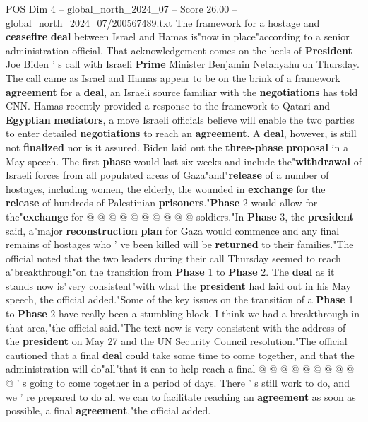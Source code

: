 \begin{textsample}{POS Dim 4 – global\_north\_2024\_07 – Score 26.00 – global\_north\_2024\_07/200567489.txt}  \label{ex:f4_pos_194}
The framework for a hostage and \textbf{ceasefire} \textbf{deal} between Israel and Hamas is"now in place"according to a senior administration official.
That acknowledgement comes on the heels of \textbf{President} Joe Biden ' s call with Israeli \textbf{Prime} Minister Benjamin Netanyahu on Thursday.
The call came as Israel and Hamas appear to be on the brink of a framework \textbf{agreement} for a \textbf{deal}, an Israeli source familiar with the \textbf{negotiations} has told CNN.
Hamas recently provided a response to the framework to Qatari and \textbf{Egyptian} \textbf{mediators}, a move Israeli officials believe will enable the two parties to enter detailed \textbf{negotiations} to reach an \textbf{agreement}.
A \textbf{deal}, however, is still not \textbf{finalized} nor is it assured.
Biden laid out the \textbf{three-phase} \textbf{proposal} in a May speech.
The first \textbf{phase} would last six weeks and include the"\textbf{withdrawal} of Israeli forces from all populated areas of Gaza"and"\textbf{release} of a number of hostages, including women, the elderly, the wounded in \textbf{exchange} for the \textbf{release} of hundreds of Palestinian \textbf{prisoners}."\textbf{Phase} 2 would allow for the"\textbf{exchange} for @ @ @ @ @ @ @ @ @ @ soldiers."In \textbf{Phase} 3, the \textbf{president} said, a"major \textbf{reconstruction} \textbf{plan} for Gaza would commence and any final remains of hostages who ' ve been killed will be \textbf{returned} to their families."The official noted that the two leaders during their call Thursday seemed to reach a"breakthrough"on the transition from \textbf{Phase} 1 to \textbf{Phase} 2.
The \textbf{deal} as it stands now is"very consistent"with what the \textbf{president} had laid out in his May speech, the official added."Some of the key issues on the transition of a \textbf{Phase} 1 to \textbf{Phase} 2 have really been a stumbling block.
I think we had a breakthrough in that area,"the official said."The text now is very consistent with the address of the \textbf{president} on May 27 and the UN Security Council resolution."The official cautioned that a final \textbf{deal} could take some time to come together, and that the administration will do"all"that it can to help reach a final @ @ @ @ @ @ @ @ @ @ ' s going to come together in a period of days.
There ' s still work to do, and we ' re prepared to do all we can to facilitate reaching an \textbf{agreement} as soon as possible, a final \textbf{agreement},"the official added.

\end{textsample}
